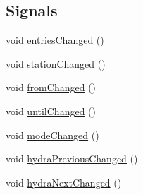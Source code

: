 \subsection*{Signals}
\begin{DoxyCompactItemize}
\item 
void \mbox{\hyperlink{classQRail_1_1LiveboardEngine_1_1Board_a6a08cd7c9e73e7b9892858d26066c1d8}{entries\+Changed}} ()
\item 
void \mbox{\hyperlink{classQRail_1_1LiveboardEngine_1_1Board_ae142ed88bebe608a99f61d09ceacf4b5}{station\+Changed}} ()
\item 
void \mbox{\hyperlink{classQRail_1_1LiveboardEngine_1_1Board_ae036b6efe4d807d6679a7f6b92f18b28}{from\+Changed}} ()
\item 
void \mbox{\hyperlink{classQRail_1_1LiveboardEngine_1_1Board_aa2d6f92cc84b2f68d7870f514e6267ef}{until\+Changed}} ()
\item 
void \mbox{\hyperlink{classQRail_1_1LiveboardEngine_1_1Board_a10e65fb6aa6c56428ba4d700e3b6a67d}{mode\+Changed}} ()
\item 
void \mbox{\hyperlink{classQRail_1_1LiveboardEngine_1_1Board_afd6981cdcbd9e49393fbb8e4a4b22157}{hydra\+Previous\+Changed}} ()
\item 
void \mbox{\hyperlink{classQRail_1_1LiveboardEngine_1_1Board_a775b5fd9886b209fc9ccdcdbbd206261}{hydra\+Next\+Changed}} ()
\end{DoxyCompactItemize}
